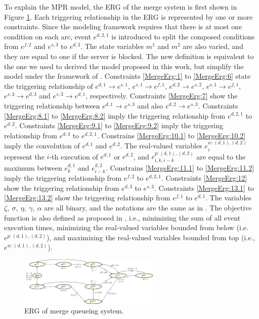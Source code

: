 \documentclass[]{interact}
\theoremstyle{plain}%
\theoremstyle{definition}
\theoremstyle{remark}
\begin{document}
To explain the MPR model, the ERG of the merge system is first shown in Figure \ref{fig:ERG_merge}. Each triggering relationship in the ERG is represented by one or more constraints. Since the modeling framework requires that there is at most one condition on each arc, event $e^{d,2,1}$ is introduced to split the composed conditions from $e^{f,2}$ and $e^{s,3}$ to $e^{d,3}$. The state variables $m^1$ and $m^2$ are also varied, and they are equal to one if the server is blocked. The new definition is equivalent to the one we used to derived the model proposed in this work, but simplify the model under the framework of \cite{chan2008optimization}. Constraints \eqref{MergeErg:1} to \eqref{MergeErg:6} state the triggering relationship of $e^{d,1}\rightarrow e^{s,1}$, $e^{s,1}\rightarrow e^{f,1}$, $e^{d,2}\rightarrow e^{s,2}$, $e^{s,1}\rightarrow e^{f,1}$, $e^{s,3}\rightarrow e^{d,3}$ and $e^{s,3}\rightarrow e^{d,1}$, respectively. Constraints \eqref{MergeErg:7} show the triggering relationship between $e^{d,1}\rightarrow e^{s,3}$ and also $e^{d,2}\rightarrow e^{s,3}$. Constraints \eqref{MergeErg:8.1} to \eqref{MergeErg:8.2} imply the triggering relationship from $e^{d,2,1}$ to $e^{d,2}$. Constraints \eqref{MergeErg:9.1} to \eqref{MergeErg:9.2} imply the triggering relationship from $e^{d,3}$ to $e^{d,2,1}$. Constrains \eqref{MergeErg:10.1} to \eqref{MergeErg:10.2} imply the convolution of $e^{d,1}$ and $e^{d,2}$. The real-valued variables $e^{w:(d,1).(d,2)}_i$ represent the $i$-th execution of $e^{d,1}$ or $e^{d,2}$, and $e^{p:(d,1),(d,2)}_{i,k,i-k}$ are equal to the maximum between $e^{d,1}_k$ and $e^{d,2}_{i-k}$. Constrains \eqref{MergeErg:11.1} to \eqref{MergeErg:11.2} imply the triggering relationship from $e^{f,2}$ to $e^{d,2,1}$. Constraints \eqref{MergeErg:12} show the triggering relationship from $e^{d,3}$ to $e^{s,3}$. Constraints \eqref{MergeErg:13.1} to \eqref{MergeErg:13.2} show the triggering relationship from $e^{f,1}$ to $e^{d,1}$. The variables $\zeta,\ \sigma,\ \eta,\ \gamma,\ \alpha$ are all binary, and the notations are the same as in \cite{chan2008optimization}. The objective function is also defined as proposed in \cite{chan2008optimization}, i.e., minimizing the sum of all event execution times, minimizing the real-valued variables bounded from below (i.e. $e^{p:(d,1),(d,2)}$), and maximizing the real-valued variables bounded from top (i.e., $e^{w:(d,1),(d,2)}$).

\begin{figure}[h]
	\centering
	\includegraphics[width=0.6\textwidth]{Figures/ERG_merge.png}
	\caption{ERG of merge queueing system.}
	\label{fig:ERG_merge}
\end{figure}
\end{document}
